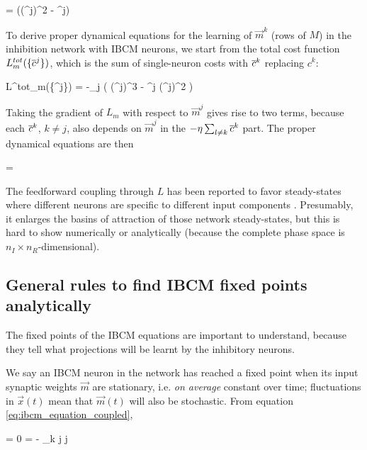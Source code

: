 \beq
	 =  ((^j)^2 - \ovl{\Theta}^j)
	\label{eq:inhibited_theta}
\eeq

To derive proper dynamical equations for the learning of $\vec{m}^k$ (rows of $M$) in the inhibition network with IBCM neurons, we start from the total cost function $L^{tot}_m(\{\overline{c}^j\})$, which is the sum of single-neuron costs with $\overline{c}^k$ replacing $c^k$:

\beq
	L^{tot}_m(\{^j\}) = -\mu \sum_j  \left( (^j)^3 -  \ovl{\Theta}^j (^j)^2 \right)
	\label{eq:inhibited_cost}
\eeq

Taking the gradient of $L_m$ with respect to $\vec{m}^j$ gives rise to two terms, because each $\overline{c}^k$, $k \neq j$, also depends on $\vec{m}^j$ in the $-\eta \sum_{l\neq k} \overline{c}^k$ part. The proper dynamical equations are then

\beq
	 = \mu {} 
	\label{eq:ibcm_equation_coupled}
\eeq


The feedforward coupling through $L$ has been reported to favor steady-states where different neurons are specific to different input components \cite{castellani_solutions_1999}. Presumably, it enlarges the basins of attraction of those network steady-states, but this is hard to show numerically or analytically (because the complete phase space is $n_I \times n_R$-dimensional). 


\subsection{General rules to find IBCM fixed points analytically}
\label{subsect:general_fixed_points}
The fixed points of the IBCM equations are important to understand, because they tell what projections will be learnt by the inhibitory neurons. 

We say an IBCM neuron in the network has reached a fixed point when its input synaptic weights $\vec{m}$ are stationary, i.e. \emph{on average} constant over time; fluctuations in $\vec{x}(t)$ mean that $\vec{m}(t)$ will also be stochastic. From equation \eqref{eq:ibcm_equation_coupled}, 

\beq
	 = 0 =   - \eta \sum_{k \neq j}  \quad \forall j
	\label{eq:ibcm_general_steady}
\eeq

